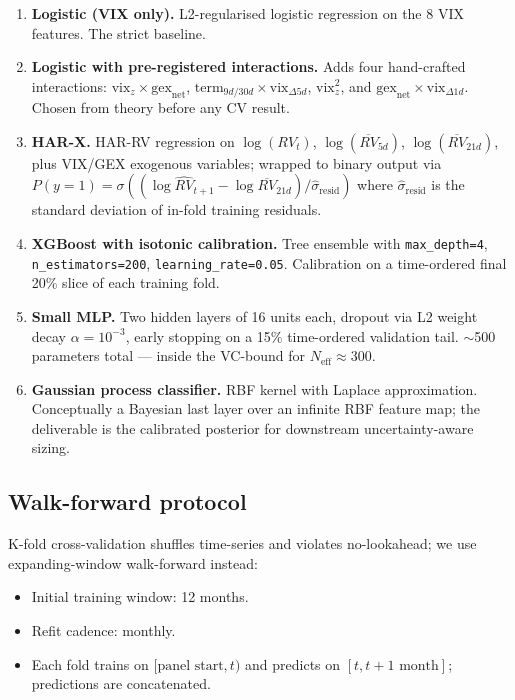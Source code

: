 \documentclass[11pt,a4paper]{article}
\begin{document}
\begin{enumerate}
    \item \textbf{Logistic (VIX only).} L2-regularised logistic regression on the 8 VIX features. The strict baseline.
    \item \textbf{Logistic with pre-registered interactions.} Adds four hand-crafted interactions: $\text{vix}_z \times \text{gex}_{\text{net}}$, $\text{term}_{9d/30d} \times \text{vix}_{\Delta 5d}$, $\text{vix}_z^2$, and $\text{gex}_{\text{net}} \times \text{vix}_{\Delta 1d}$. Chosen from theory before any CV result.
    \item \textbf{HAR-X.} \cite{corsi2009har} HAR-RV regression on $\log(RV_t)$, $\log(\overline{RV}_{5d})$, $\log(\overline{RV}_{21d})$, plus VIX/GEX exogenous variables; wrapped to binary output via $P(y=1) = \sigma\!\left((\log \hat{RV}_{t+1} - \log \overline{RV}_{21d}) / \hat\sigma_{\text{resid}}\right)$ where $\hat\sigma_{\text{resid}}$ is the standard deviation of in-fold training residuals.
    \item \textbf{XGBoost with isotonic calibration.} Tree ensemble with \verb|max_depth=4|, \verb|n_estimators=200|, \verb|learning_rate=0.05|. Calibration on a time-ordered final 20\% slice of each training fold.
    \item \textbf{Small MLP.} Two hidden layers of 16 units each, dropout via L2 weight decay $\alpha = 10^{-3}$, early stopping on a 15\% time-ordered validation tail. $\sim$500 parameters total --- inside the VC-bound for $N_{\text{eff}} \approx 300$.
    \item \textbf{Gaussian process classifier.} RBF kernel with Laplace approximation. Conceptually a Bayesian last layer over an infinite RBF feature map; the deliverable is the calibrated posterior for downstream uncertainty-aware sizing.
\end{enumerate}

\subsection{Walk-forward protocol}

K-fold cross-validation shuffles time-series and violates no-lookahead; we use expanding-window walk-forward instead:
\begin{itemize}
    \item Initial training window: 12 months.
    \item Refit cadence: monthly.
    \item Each fold trains on $[\text{panel start}, t)$ and predicts on $[t, t + 1 \text{ month}]$; predictions are concatenated.
\end{itemize}
\end{document}
